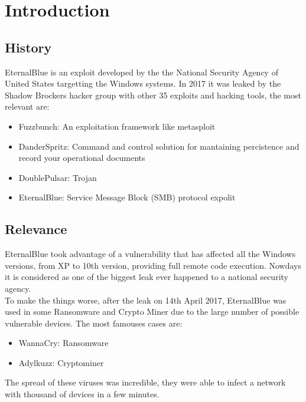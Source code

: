 \section{Introduction}
\subsection{History}
EternalBlue is an exploit developed by the the National Security Agency of United States targetting the Windows systems\cite{nsa-hacked}.
In 2017 it was leaked by the Shadow Brockers hacker group with other 35 exploits and hacking
tools, the most relevant are:
\begin{itemize}
    \item Fuzzbunch: An exploitation framework like metasploit
    \item DanderSpritz: Command and control solution for mantaining percistence and
    record your operational documents
    \item DoublePulsar: Trojan
    \item EternalBlue: Service Message Block (SMB) protocol expolit
\end{itemize}

\subsection{Relevance}
EternalBlue took advantage of a vulnerability that has affected all the Windows versions, from XP to 10th version, providing full remote code execution\cite{microsoft-bulletin}.
Nowdays it is considered as one of the biggest leak ever happened to a national security agency.\\
To make the things worse, after the leak on 14th April 2017, EternalBlue was used in some Ransomware\cite{exploit-wannacryptor} and Crypto Miner due to the large number of possible vulnerable devices.
The most famouses cases are:
\begin{itemize}
    \item WannaCry: Ransomware
    \item Adylkuzz: Cryptominer
\end{itemize}
The spread of these viruses was incredible, they were able to infect a network with thousand of devices in a few minutes.